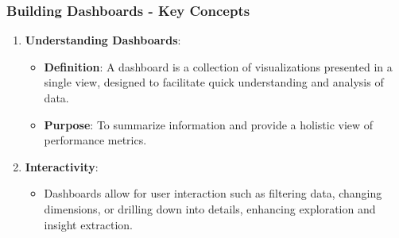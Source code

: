 \documentclass[aspectratio=169]{beamer}
\begin{document}
\begin{frame}[fragile]
    \frametitle{Building Dashboards - Key Concepts}
    \begin{enumerate}
        \item \textbf{Understanding Dashboards}:
        \begin{itemize}
            \item \textbf{Definition}: A dashboard is a collection of visualizations presented in a single view, designed to facilitate quick understanding and analysis of data.
            \item \textbf{Purpose}: To summarize information and provide a holistic view of performance metrics.
        \end{itemize}
        
        \item \textbf{Interactivity}:
        \begin{itemize}
            \item Dashboards allow for user interaction such as filtering data, changing dimensions, or drilling down into details, enhancing exploration and insight extraction.
        \end{itemize}
    \end{enumerate}
\end{frame}
\end{document}
